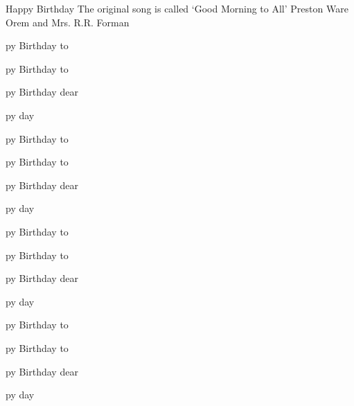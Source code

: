 \begin{SBSong}{Happy Birthday}
  {The original song is called `Good Morning to All'}
  {Preston Ware Orem and Mrs. R.R. Forman}
  \begin{SBVerse}
    py Birthday to 
    
    py Birthday to 
 
    py Birthday dear 
   
    py day  
  \end{SBVerse}
  \ifChordBk
    \begin{SBVerse}  
      py Birthday to 
    
      py Birthday to 
 
      py Birthday dear 
   
      py day  
    \end{SBVerse}
    \begin{SBVerse}
      py Birthday to 
    
      py Birthday to 
 
      py Birthday dear 
   
      py day  
    \end{SBVerse}
    \begin{SBVerse}
      py Birthday to 
    
      py Birthday to 
 
      py Birthday dear 
   
      py day  
    \end{SBVerse}
  \fi
\end{SBSong}

